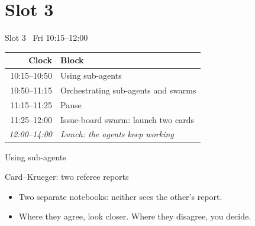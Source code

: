
\section{Slot 3}

\begin{frame}{Slot 3 \textperiodcentered\ Fri 10:15--12:00}
  \begin{center}
    \begin{tabular}{@{}rl@{}}
      \toprule
      \textbf{Clock} & \textbf{Block} \\
      \midrule
      10:15--10:50 & Using sub-agents \\
      10:50--11:15 & Orchestrating sub-agents and swarms \\
      11:15--11:25 & Pause \\
      11:25--12:00 & Issue-board swarm: launch two cards \\
      \textit{12:00--14:00} & \textit{Lunch: the agents keep working} \\
      \bottomrule
    \end{tabular}
  \end{center}
\end{frame}

\begin{frame}{Using sub-agents}
\end{frame}

\begin{frame}{Card--Krueger: two referee reports}
  \vspace{0.4em}
  \vspace{0.6em}
  \begin{itemize}
    \item Two separate notebooks: neither sees the other's report.
    \item Where they agree, look closer. Where they disagree, you decide.
  \end{itemize}
\end{frame}

